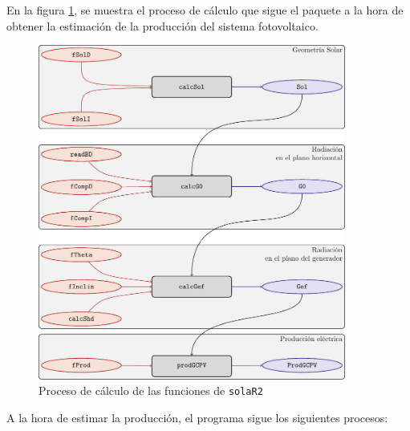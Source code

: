En la figura \ref{fig:orge3c8a79}, se muestra el proceso de cálculo que sigue el paquete a la hora de obtener la estimación de la producción del sistema fotovoltaico.
\begin{figure}[p]
\centering
\includegraphics[keepaspectratio,width=0.9\textwidth,height=0.5\textheight]{figuras/procedure.pdf}
\caption{\label{fig:orge3c8a79}Proceso de cálculo de las funciones de \texttt{solaR2}}
\end{figure}
A la hora de estimar la producción, el programa sigue los siguientes procesos:
